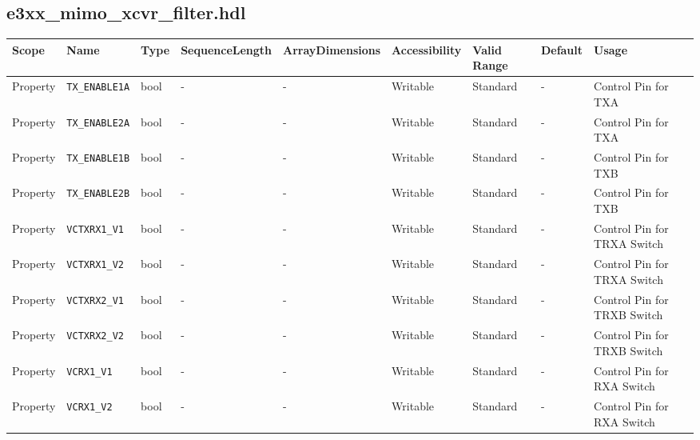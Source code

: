 \documentclass{article}
\def\comp{e3xx\_mimo\_xcvr\_filter}
\begin{document}
\begin{landscape}
\subsection*{\comp.hdl}
	\begin{scriptsize}
		\begin{tabular}{|p{2cm}|p{2.5cm}|p{1cm}|p{2cm}|p{2cm}|p{1.75cm}|p{2cm}|p{2cm}|p{5.29cm}|}
			\hline
			\rowcolor{blue}
			Scope        & Name                 & Type  & SequenceLength & ArrayDimensions & Accessibility & Valid Range & Default & Usage \\
			\hline
			Property     & \verb+TX_ENABLE1A+   & bool  & -              & -               & Writable      & Standard    & -       & Control Pin for TXA    \\
			\hline
			Property     & \verb+TX_ENABLE2A+   & bool  & -              & -               & Writable      & Standard    & -       & Control Pin for TXA    \\
			\hline
			Property     & \verb+TX_ENABLE1B+   & bool  & -              & -               & Writable      & Standard    & -       & Control Pin for TXB    \\
			\hline
			Property     & \verb+TX_ENABLE2B+   & bool  & -              & -               & Writable      & Standard    & -       & Control Pin for TXB    \\
			\hline
			Property     & \verb+VCTXRX1_V1+    & bool  & -              & -               & Writable      & Standard    & -       & Control Pin for TRXA Switch   \\
			\hline
			Property     & \verb+VCTXRX1_V2+    & bool  & -              & -               & Writable      & Standard    & -       & Control Pin for TRXA Switch   \\
			\hline
			Property     & \verb+VCTXRX2_V1+    & bool  & -              & -               & Writable      & Standard    & -       & Control Pin for TRXB Switch   \\
			\hline
			Property     & \verb+VCTXRX2_V2+    & bool  & -              & -               & Writable      & Standard    & -       & Control Pin for TRXB Switch   \\
			\hline
			Property     & \verb+VCRX1_V1+      & bool  & -              & -               & Writable      & Standard    & -       & Control Pin for RXA Switch   \\
			\hline
			Property     & \verb+VCRX1_V2+      & bool  & -              & -               & Writable      & Standard    & -       & Control Pin for RXA Switch   \\

\end{tabular}
\end{scriptsize}
\end{landscape}
\end{document}
